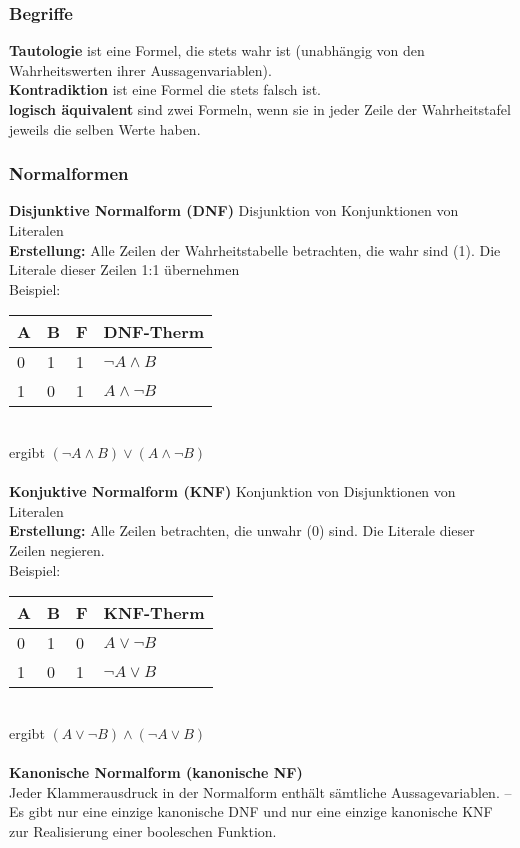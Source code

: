 \documentclass[6pt,a4paper]{scrartcl}
\begin{document}
\begin{multicols*}{3}
\subsubsection{Begriffe}
\textbf{Tautologie} ist eine Formel, die stets wahr ist (unabhängig von den Wahrheitswerten ihrer Aussagenvariablen). \\
\textbf{Kontradiktion} ist eine Formel die stets falsch ist. \\
\textbf{logisch äquivalent} sind zwei Formeln, wenn sie in jeder Zeile der Wahrheitstafel jeweils die selben Werte haben. \\

\subsubsection{Normalformen}
\textbf{Disjunktive Normalform (DNF)} Disjunktion von Konjunktionen von Literalen \\
\textbf{Erstellung:} Alle Zeilen der Wahrheitstabelle betrachten, die wahr sind (1). Die Literale dieser Zeilen 1:1 übernehmen \\
Beispiel:
\begin{tabular}{l|l|l|l}
A & B & F & DNF-Therm \\
\hline
0 & 1 & 1 & $\neg A \land B$ \\
1 & 0 & 1 & $A \land \neg B$ \\
\end{tabular} \\
ergibt $(\neg A \land B) \lor (A \land \neg B)$ \\
\\
\textbf{Konjuktive Normalform (KNF)} Konjunktion von Disjunktionen von Literalen\\
\textbf{Erstellung:} Alle Zeilen betrachten, die unwahr (0) sind. Die Literale dieser Zeilen negieren. \\
Beispiel:
\begin{tabular}{l|l|l|l}
A & B & F & KNF-Therm \\
\hline
0 & 1 & 0 & $A \lor \neg B$ \\
1 & 0 & 1 & $\neg A \lor B$ \\
\end{tabular} \\
ergibt $(A \lor \neg B) \land (\neg A \lor B)$ \\
\\
\textbf{Kanonische Normalform (kanonische NF)}\\
Jeder Klammerausdruck in der Normalform enthält sämtliche Aussagevariablen. – Es gibt nur eine einzige
kanonische DNF und nur eine einzige kanonische KNF zur Realisierung einer booleschen Funktion. 



\end{multicols*}
\end{document}
